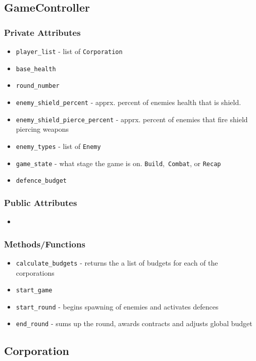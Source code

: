 \documentclass[12pt]{article}
\begin{document}
\subsection*{GameController}
\subsubsection*{Private Attributes}
\begin{itemize}
\item \texttt{player\_list} - list of \texttt{Corporation}
\item \texttt{base\_health}
\item \texttt{round\_number}
\item \texttt{enemy\_shield\_percent} - apprx. percent of enemies health that is
shield.
\item \texttt{enemy\_shield\_pierce\_percent} - apprx. percent of enemies that
fire shield piercing weapons
\item \texttt{enemy\_types} - list of \texttt{Enemy}
\item \texttt{game\_state} - what stage the game is on. \texttt{Build},\
\texttt{Combat}, or \texttt{Recap}
\item \texttt{defence\_budget}
\end{itemize}
\subsubsection*{Public Attributes}
\begin{itemize}
\item 
\end{itemize}
\subsubsection*{Methods/Functions}
\begin{itemize}
\item \texttt{calculate\_budgets} - returns the a list of budgets for each
of the corporations
\item \texttt{start\_game}
\item \texttt{start\_round} - begins spawning of enemies and activates defences
\item \texttt{end\_round} - sums up the round, awards contracts and adjusts
global budget
\end{itemize}



\subsection*{Corporation}
\end{document}

